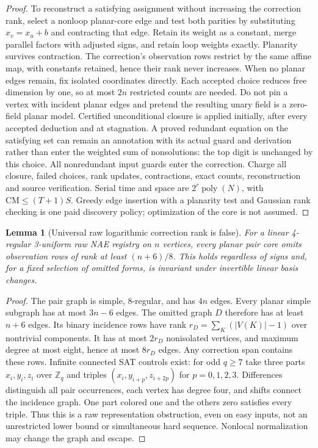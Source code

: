 \documentclass[11pt]{article}
\newtheorem{lemma}[theorem]{Lemma}
\begin{document}
\begin{proof}
To reconstruct a satisfying assignment without increasing the correction rank, select a nonloop planar-core edge and test both parities by substituting $x_v=x_u+b$ and contracting that edge. Retain its weight as a constant, merge parallel factors with adjusted signs, and retain loop weights exactly. Planarity survives contraction. The correction's observation rows restrict by the same affine map, with constants retained, hence their rank never increases. When no planar edges remain, fix isolated coordinates directly. Each accepted choice reduces free dimension by one, so at most $2n$ restricted counts are needed. Do not pin a vertex with incident planar edges and pretend the resulting unary field is a zero-field planar model. Certified unconditional closure is applied initially, after every accepted deduction and at stagnation. A proved redundant equation on the satisfying set can remain an annotation with its actual guard and derivation rather than enter the weighted sum of nonsolutions: the top digit is unchanged by this choice. All nonredundant input guards enter the correction. Charge all closure, failed choices, rank updates, contractions, exact counts, reconstruction and source verification. Serial time and space are $2^r\operatorname{poly}(N)$, with $\mathrm{CM}\le(T+1)S$. Greedy edge insertion with a planarity test and Gaussian rank checking is one paid discovery policy; optimization of the core is not assumed.
\end{proof}
\begin{lemma}[Universal raw logarithmic correction rank is false]\label{lem:bd20-rank}
For a linear 4-regular 3-uniform raw NAE registry on $n$ vertices, every planar pair core omits observation rows of rank at least $(n+6)/8$. This holds regardless of signs and, for a fixed selection of omitted forms, is invariant under invertible linear basis changes.
\end{lemma}
\begin{proof}
The pair graph is simple, 8-regular, and has $4n$ edges. Every planar simple subgraph has at most $3n-6$ edges. The omitted graph $D$ therefore has at least $n+6$ edges. Its binary incidence rows have rank $r_D=\sum_K(|V(K)|-1)$ over nontrivial components. It has at most $2r_D$ nonisolated vertices, and maximum degree at most eight, hence at most $8r_D$ edges. Any correction span contains these rows. Infinite connected SAT controls exist: for odd $q\ge7$ take three parts $x_i,y_i,z_i$ over $\mathbb Z_q$ and triples $(x_i,y_{i+p},z_{i+2p})$ for $p=0,1,2,3$. Differences distinguish all pair occurrences, each vertex has degree four, and shifts connect the incidence graph. One part colored one and the others zero satisfies every triple. Thus this is a raw representation obstruction, even on easy inputs, not an unrestricted lower bound or simultaneous hard sequence. Nonlocal normalization may change the graph and escape.
\end{proof}
\end{document}
